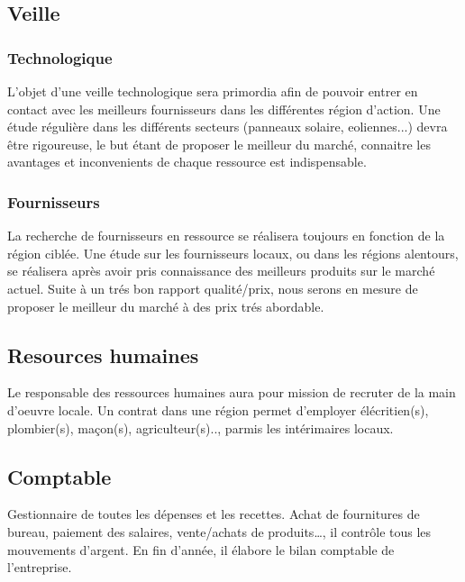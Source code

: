 \documentclass[11pt]{article}
\begin{document}
\subsection{Veille}
\label{sec:}
\subsubsection{Technologique}
\label{ssub:}
L'objet d'une veille technologique sera primordia afin de pouvoir entrer en contact avec les meilleurs fournisseurs dans les différentes région d'action. Une étude régulière dans les différents secteurs (panneaux solaire, eoliennes...) devra être rigoureuse, le but étant de proposer le meilleur du marché, connaitre les avantages et inconvenients de chaque ressource est indispensable.


\subsubsection{Fournisseurs}
\label{ssub:}
La recherche de fournisseurs en ressource se réalisera toujours en fonction de la région ciblée. Une étude sur les fournisseurs locaux, ou dans les régions alentours, se réalisera après avoir pris connaissance des meilleurs produits sur le marché actuel. Suite à un trés bon rapport qualité/prix, nous serons en mesure de proposer le meilleur du marché à des prix trés abordable.


\subsection{Resources humaines}
\label{sec:rh}
Le responsable des ressources humaines aura pour mission de recruter de la main d'oeuvre locale. Un contrat dans une région permet d'employer élécritien(s), plombier(s), maçon(s), agriculteur(s).., parmis les intérimaires locaux.

\subsection{Comptable}
\label{sec:}
Gestionnaire de toutes les dépenses et les recettes. Achat de fournitures de bureau, paiement des salaires, vente/achats de produits…, il contrôle tous les mouvements d’argent. En fin d’année, il élabore le bilan comptable de l’entreprise. 
\end{document}
